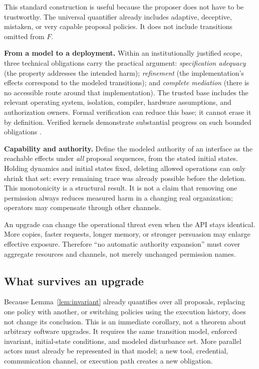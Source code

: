 \documentclass[10pt,twocolumn,letterpaper]{article}
\newcommand{\para}[1]{\smallskip\noindent\textbf{#1}\enspace}
\begin{document}
This standard construction is useful because the proposer does not have to be trustworthy. The universal quantifier already includes adaptive, deceptive, mistaken, or very capable proposal policies. It does not include transitions omitted from $F$.

\para{From a model to a deployment.} Within an institutionally justified scope, three technical obligations carry the practical argument: \emph{specification adequacy} (the property addresses the intended harm); \emph{refinement} (the implementation's effects correspond to the modeled transitions); and \emph{complete mediation} (there is no accessible route around that implementation). The trusted base includes the relevant operating system, isolation, compiler, hardware assumptions, and authorization owners. Formal verification can reduce this base; it cannot erase it by definition. Verified kernels demonstrate substantial progress on such bounded obligations \cite{sel4}.

\para{Capability and authority.} Define the modeled authority of an interface as the reachable effects under \emph{all} proposal sequences, from the stated initial states. Holding dynamics and initial states fixed, deleting allowed operations can only shrink that set: every remaining trace was already possible before the deletion. This monotonicity is a structural result. It is not a claim that removing one permission always reduces measured harm in a changing real organization; operators may compensate through other channels.

An upgrade can change the operational threat even when the API stays identical. More copies, faster requests, longer memory, or stronger persuasion may enlarge effective exposure. Therefore ``no automatic authority expansion'' must cover aggregate resources and channels, not merely unchanged permission names.



\subsection{What survives an upgrade}
\label{sec:upgrade}
Because Lemma~\ref{lem:invariant} already quantifies over all proposals, replacing one policy with another, or switching policies using the execution history, does not change its conclusion. This is an immediate corollary, not a theorem about arbitrary software upgrades. It requires the same transition model, enforced invariant, initial-state conditions, and modeled disturbance set. More parallel actors must already be represented in that model; a new tool, credential, communication channel, or execution path creates a new obligation.
\end{document}
